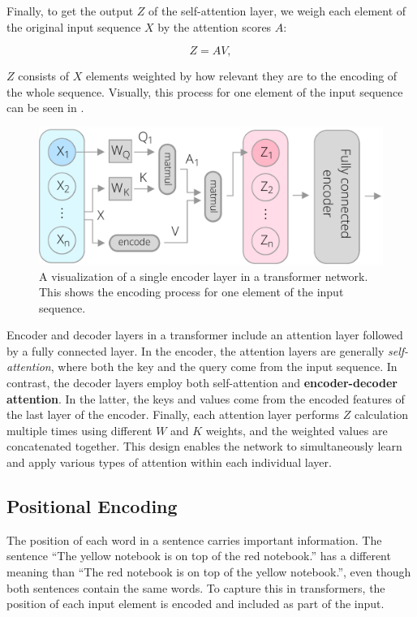 Finally, to get the output $Z$ of the self-attention layer, we weigh each element of the original input sequence $X$ by the attention scores $A$:

\begin{equation}
Z = A V,
\end{equation}

$Z$ consists of $X$ elements weighted by how relevant they are to the encoding of the whole sequence. Visually, this process for one element of the input sequence can be seen in .

 \begin{figure}[h!]
 \centering
 \includegraphics[width=0.8\linewidth]{images/attention-explainer}
 \caption{A visualization of a single encoder layer in a transformer network. This shows the encoding process for one element of the input sequence.}
 \label{fig:attention-explainer}
 \end{figure}
 
 Encoder and decoder layers in a transformer include an attention layer followed by a fully connected layer. In the encoder, the attention layers are generally \textit{self-attention}, where both the key and the query come from the input sequence. In contrast, the decoder layers employ both self-attention and \textbf{encoder-decoder attention}. In the latter, the keys and values come from the encoded features of the last layer of the encoder. Finally, each attention layer performs $Z$ calculation multiple times using different $W$ and $K$ weights, and the weighted values are concatenated together. This design enables the network to simultaneously learn and apply various types of attention within each individual layer.
 
 \subsection{Positional Encoding}
 
The position of each word in a sentence carries important information. The sentence ``The yellow notebook is on top of the red notebook.'' has a different meaning than ``The red notebook is on top of the yellow notebook.'', even though both sentences contain the same words. To capture this in transformers, the position of each input element is encoded and included as part of the input.
 
